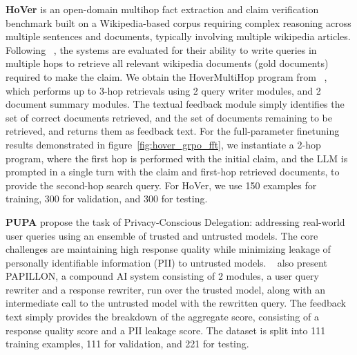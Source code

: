 \documentclass{article} %
\begin{document}
\textbf{HoVer} \citep{hover_bench} is an open-domain multihop fact extraction and claim verification benchmark built on a Wikipedia-based corpus requiring complex reasoning across multiple sentences and documents, typically involving multiple wikipedia articles. Following ~\citet{langprobe}, the systems are evaluated for their ability to write queries in multiple hops to retrieve all relevant wikipedia documents (gold documents) required to make the claim. We obtain the HoverMultiHop program from ~\citet{langprobe}, which performs up to 3-hop retrievals using 2 query writer modules, and 2 document summary modules. The textual feedback module simply identifies the set of correct documents retrieved, and the set of documents remaining to be retrieved, and returns them as feedback text. For the full-parameter finetuning results demonstrated in figure~\ref{fig:hover_grpo_fft}, we instantiate a 2-hop program, where the first hop is performed with the initial claim, and the LLM is prompted in a single turn with the claim and first-hop retrieved documents, to provide the second-hop search query. For HoVer, we use 150 examples for training, 300 for validation, and 300 for testing.

\textbf{PUPA} \citep{papillon_bench} propose the task of Privacy-Conscious Delegation: addressing real-world user queries using an ensemble of trusted and untrusted models. The core challenges are maintaining high response quality while minimizing leakage of personally identifiable information (PII) to untrusted models. ~\citet{papillon_bench} also present PAPILLON, a compound AI system consisting of 2 modules, a user query rewriter and a response rewriter, run over the trusted model, along with an intermediate call to the untrusted model with the rewritten query. The feedback text simply provides the breakdown of the aggregate score, consisting of a response quality score and a PII leakage score. The dataset is split into 111 training examples, 111 for validation, and 221 for testing.

\end{document}
